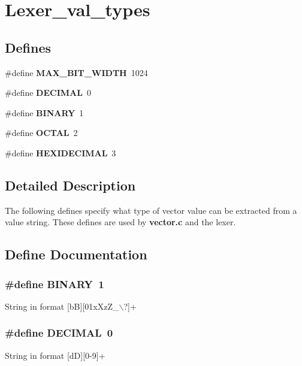\section{Lexer\_\-val\_\-types}
\label{group__lexer__val__types}
\subsection*{Defines}
\begin{CompactItemize}
\item 
\#define {\bf MAX\_\-BIT\_\-WIDTH}\ 1024
\item 
\#define {\bf DECIMAL}\ 0
\item 
\#define {\bf BINARY}\ 1
\item 
\#define {\bf OCTAL}\ 2
\item 
\#define {\bf HEXIDECIMAL}\ 3
\end{CompactItemize}


\subsection{Detailed Description}
The following defines specify what type of vector value can be extracted from a value string. These defines are used by {\bf vector.c} and the lexer. 

\subsection{Define Documentation}
\subsubsection{\setlength{\rightskip}{0pt plus 5cm}\#define BINARY\ 1}\label{group__lexer__val__types_a2}


String in format [b\-B][01x\-Xz\-Z\_\-$\backslash$?]+ 
\subsubsection{\setlength{\rightskip}{0pt plus 5cm}\#define DECIMAL\ 0}\label{group__lexer__val__types_a1}


String in format [d\-D][0-9]+ 
